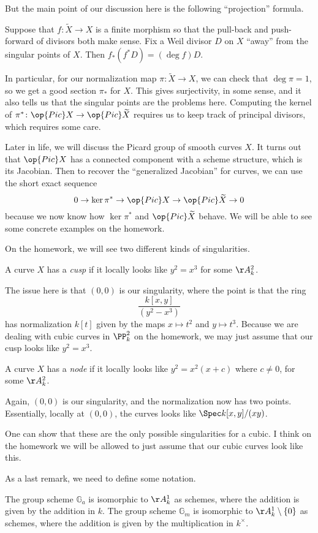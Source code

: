 \documentclass[../notes.tex]{subfiles}
\begin{document}
But the main point of our discussion here is the following ``projection'' formula.
\begin{theorem}
	Suppose that $f\colon\widetilde X\to X$ is a finite morphism so that the pull-back and push-forward of divisors both make sense. Fix a Weil divisor $D$ on $X$ ``away'' from the singular points of $X$. Then $f_*(f^*D)=(\deg f)D$.
\end{theorem}
In particular, for our normalization map $\pi\colon\widetilde X\to X$, we can check that $\deg\pi=1$, so we get a good section $\pi_*$ for $X$. This gives surjectivity, in some sense, and it also tells us that the singular points are the problems here. Computing the kernel of $\pi^*\colon\op{Pic}X\to\op{Pic}\widetilde X$ requires us to keep track of principal divisors, which requires some care.
\begin{remark}
	Later in life, we will discuss the Picard group of smooth curves $X$. It turns out that $\op{Pic}X$ has a connected component with a scheme structure, which is its Jacobian. Then to recover the ``generalized Jacobian'' for curves, we can use the short exact sequence
	\[0\to\ker\pi^*\to\op{Pic}X\to\op{Pic}\widetilde X\to0\]
	because we now know how $\ker\pi^*$ and $\op{Pic}\widetilde X$ behave. We will be able to see some concrete examples on the homework.
\end{remark}
On the homework, we will see two different kinds of singularities.
\begin{definition}[Cusp]
	A curve $X$ has a \textit{cusp} if it locally looks like $y^2=x^3$ for some $\AA^2_k$.
\end{definition}
The issue here is that $(0,0)$ is our singularity, where the point is that the ring
\[\frac{k[x,y]}{\left(y^2-x^3\right)}\]
has normalization $k[t]$ given by the maps $x\mapsto t^2$ and $y\mapsto t^3$. Because we are dealing with cubic curves in $\PP^2_k$ on the homework, we may just assume that our cusp looks like $y^2=x^3$.
\begin{definition}[Node]
	A curve $X$ has a \textit{node} if it locally looks like $y^2=x^2(x+c)$ where $c\ne0$, for some $\AA^2_k$.
\end{definition}
Again, $(0,0)$ is our singularity, and the normalization now has two points. Essentially, locally at $(0,0)$, the curves looks like $\Spec k[x,y]/(xy)$.
\begin{remark}
	One can show that these are the only possible singularities for a cubic. I think on the homework we will be allowed to just assume that our cubic curves look like this.
\end{remark}
As a last remark, we need to define some notation.
\begin{notation}
	The group scheme $\mathbb G_a$ is isomorphic to $\AA^1_k$ as schemes, where the addition is given by the addition in $k$. The group scheme $\mathbb G_m$ is isomorphic to $\AA^1_k\setminus\{0\}$ as schemes, where the addition is given by the multiplication in $k^\times$.
\end{notation}
\end{document}
